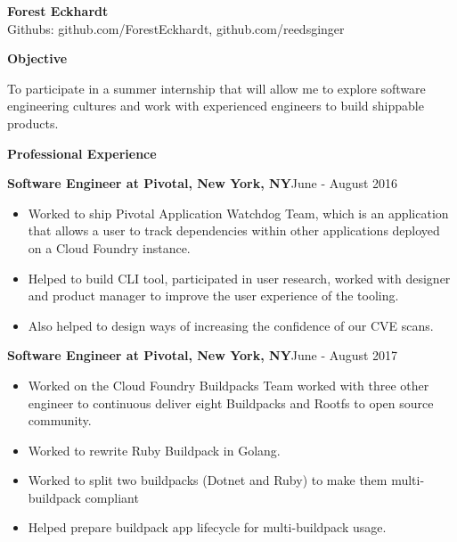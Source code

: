 \documentclass[10pt,a4papaer]{article}
\begin{document}
{\selectfont
	
	\begin{center}	
		{\huge\textbf{Forest Eckhardt}} \\
		Githubs: github.com/ForestEckhardt, github.com/reedsginger \\
	\end{center}
	
	{\noindent\textbf{Objective}}\vspace*{-20px}\\
	
	\noindent\makebox[\linewidth]{\rule{\textwidth}{1.2pt}}
	
	\setlength{\leftskip}{15pt}
	
	{\noindent To participate in a summer internship that will allow me to explore software engineering cultures and work with experienced engineers to build shippable products.}\\
	
	\setlength{\leftskip}{0pt}
	
	{\noindent\textbf{Professional Experience}}\vspace*{-20px}\\
	
	\noindent\makebox[\linewidth]{\rule{\textwidth}{1.2pt}}
	
	\setlength{\leftskip}{15pt}
	
	{\noindent\textbf{Software Engineer at Pivotal, New York, NY}}{\hfill June - August 2016}
	
	\begin{itemize}[noitemsep, topsep=0pt]
		\item Worked to ship Pivotal Application Watchdog Team, which is an application that allows a user to track dependencies within other applications deployed on a Cloud Foundry instance. 
		\item Helped to build CLI tool, participated in user research, worked with designer and product manager to improve the user experience of the tooling. \item Also helped to design ways of increasing the confidence of our CVE scans.\\
	\end{itemize}
	
	{\noindent\textbf{Software Engineer at Pivotal, New York, NY}}{\hfill June - August 2017}
	\begin{itemize}[noitemsep, topsep=0pt]
		\item Worked on the Cloud Foundry Buildpacks Team worked with three other engineer to continuous deliver eight Buildpacks and Rootfs to open source community. 
		\item Worked to rewrite Ruby Buildpack in Golang.
		\item Worked to split two buildpacks (Dotnet and Ruby) to make them multi-buildpack compliant
		\item Helped prepare buildpack app lifecycle for multi-buildpack usage.\\
		

\end{itemize}}
\end{document}

